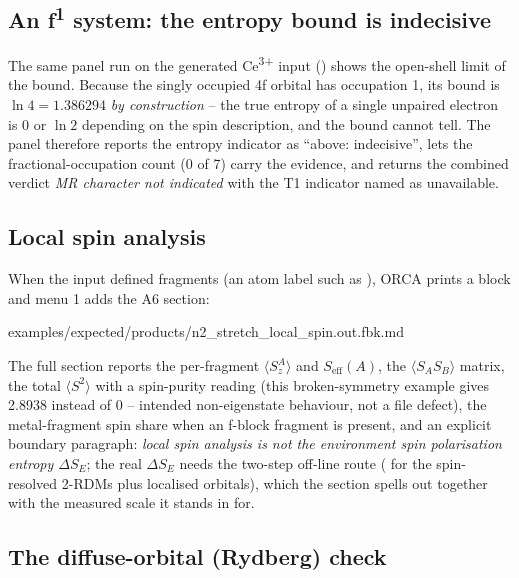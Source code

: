 \subsection{An f\textsuperscript{1} system: the entropy bound is indecisive}

The same panel run on the generated Ce\textsuperscript{3+} input
() shows the open-shell limit of the bound.
Because the singly occupied 4f orbital has occupation 1, its bound is
$\ln 4 = 1.386294$ \emph{by construction} -- the true entropy of a single
unpaired electron is 0 or $\ln 2$ depending on the spin description, and the
bound cannot tell. The panel therefore reports the entropy indicator as
``above: indecisive'', lets the fractional-occupation count (0 of 7) carry the
evidence, and returns the combined verdict \emph{MR character not indicated}
with the T1 indicator named as unavailable.

\subsection{Local spin analysis}
\label{sec:menu1-local-spin}

When the input defined fragments (an atom label such as ), ORCA
prints a  block and menu 1 adds the A6 section:


  {examples/expected/products/n2_stretch_local_spin.out.fbk.md}

The full section reports the per-fragment $\langle S_z^A \rangle$ and
$S_{\mathrm{eff}}(A)$, the $\langle S_A S_B \rangle$ matrix, the total
$\langle S^2 \rangle$ with a spin-purity reading (this broken-symmetry example
gives 2.8938 instead of 0 -- intended non-eigenstate behaviour, not a file
defect), the metal-fragment spin share when an f-block fragment is present, and
an explicit boundary paragraph: \emph{local spin analysis is not the
environment spin polarisation entropy $\Delta S_E$}; the real $\Delta S_E$
needs the two-step off-line route ( for the spin-resolved
2-RDMs plus  localised orbitals), which the section spells out
together with the measured scale it stands in for.

\subsection{The diffuse-orbital (Rydberg) check}

